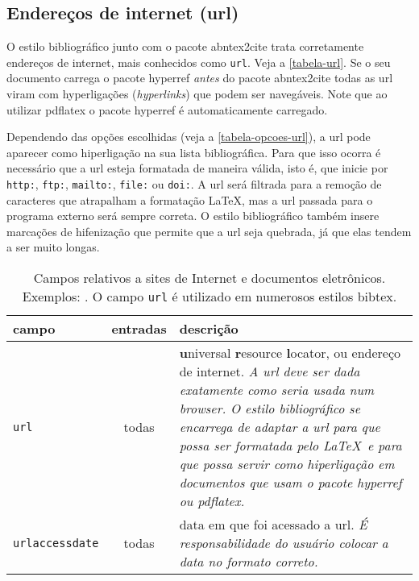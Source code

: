 \documentclass[a4paper]{ltxdoc}
\begin{document}
\subsection{Endereços de internet (url)}\label{sec-url}

O estilo bibliográfico junto com o pacote \textsf{abntex2cite} trata
corretamente endereços de internet, mais conhecidos como \texttt{url}. Veja a
\autoref{tabela-url}. Se o seu documento carrega o pacote \textsf{hyperref}
\emph{antes} do pacote \textsf{abntex2cite} todas as url viram com hyperligações
(\emph{hyperlinks}) que podem ser navegáveis. Note que ao utilizar
\textsf{pdflatex} o pacote \textsf{hyperref} é automaticamente carregado.

Dependendo das opções escolhidas (veja a \autoref{tabela-opcoes-url}),
a url pode aparecer como hiperligação na sua lista bibliográfica. Para que isso
ocorra é necessário que a url esteja formatada de maneira válida, isto é, que inicie por
\texttt{http:}, \texttt{ftp:}, \texttt{mailto:}, \texttt{file:} ou \texttt{doi:}. A url será
filtrada para a remoção de caracteres que atrapalham a formatação \LaTeX, mas a
url passada para o programa externo será sempre correta. O estilo bibliográfico
também insere marcações de hifenização que permite que a url seja quebrada, já
que elas tendem a ser muito longas.

\begin{table}[htbp]
\caption[Campos relativos a sites de Internet e documentos eletrônicos]%
{Campos relativos a sites de Internet e documentos eletrônicos.
Exemplos: .
O campo \texttt{url} é utilizado em numerosos estilos \textsf{bibtex}.}
\label{tabela-url}

\begin{center}
\begin{tabular}{lcp{8cm}}\hline\hline
campo & entradas & descrição \\ \hline
\texttt{url}   & todas    & \textbf{u}niversal \textbf{r}esource \textbf{l}ocator, ou endereço
de internet. \emph{A url deve ser dada exatamente como seria usada num browser.
O estilo bibliográfico se encarrega de adaptar a url para que possa ser formatada
pelo \LaTeX~e para que possa servir como hiperligação em documentos que usam o
pacote \textsf{hyperref} ou \textsf{pdflatex}.}
\\ \hline
\texttt{urlaccessdate} & todas & data em que foi acessado a url.
\emph{É responsabilidade
do usuário colocar a data no formato correto.}
\\ \hline\hline
\end{tabular}
\end{center}
\end{table}
\end{document}

